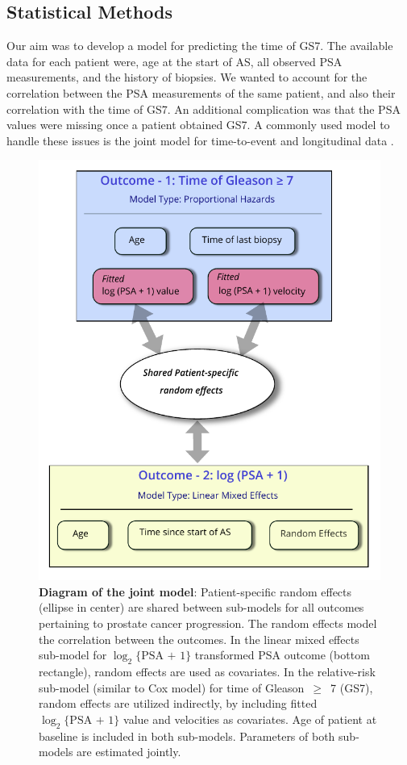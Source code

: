 \subsection{Statistical Methods}
Our aim was to develop a model for predicting the time of GS7. The available data for each patient were, age at the start of AS, all observed PSA measurements, and the history of biopsies. We wanted to account for the correlation between the PSA measurements of the same patient, and also their correlation with the time of GS7. An additional complication was that the PSA values were missing once a patient obtained GS7. A commonly used model to handle these issues is the joint model for time-to-event and longitudinal data \citep{rizopoulos2012joint,tomer2019,coley2017prediction}.

\begin{figure}[!htb]
\centerline{\includegraphics[width=\columnwidth]{images/jm_blockdiag.pdf}}
\caption{\textbf{Diagram of the joint model}: Patient-specific random effects (ellipse in center) are shared between sub-models for all outcomes pertaining to prostate cancer progression. The random effects model the correlation between the outcomes. In the linear mixed effects sub-model for $\log_2\{\mbox{PSA + 1}\}$ transformed PSA outcome (bottom rectangle), random effects are used as covariates. In the relative-risk sub-model (similar to Cox model) for time of Gleason~$\geq$~7 (GS7), random effects are utilized indirectly, by including fitted $\log_2\{\mbox{PSA + 1}\}$ value and velocities as covariates. Age of patient at baseline is included in both sub-models. Parameters of both sub-models are estimated jointly.}
\label{fig:jm_blockdiag}
\end{figure}

